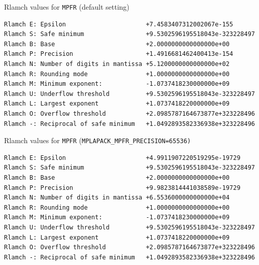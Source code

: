 \documentclass[12pt]{article}
\begin{document}
\begin{table}
\caption{Rlamch values for {\tt MPFR} (default setting) }\label{rlamchmpfr}
\begin{center}
\begin{verbatim}
Rlamch E: Epsilon                      +7.4583407312002067e-155
Rlamch S: Safe minimum                 +9.5302596195518043e-323228497
Rlamch B: Base                         +2.0000000000000000e+00
Rlamch P: Precision                    +1.4916681462400413e-154
Rlamch N: Number of digits in mantissa +5.1200000000000000e+02
Rlamch R: Rounding mode                +1.0000000000000000e+00
Rlamch M: Minimum exponent:            -1.0737418230000000e+09
Rlamch U: Underflow threshold          +9.5302596195518043e-323228497
Rlamch L: Largest exponent             +1.0737418220000000e+09
Rlamch O: Overflow threshold           +2.0985787164673877e+323228496
Rlamch -: Reciprocal of safe minimum   +1.0492893582336938e+323228496
\end{verbatim}
\end{center}
\end{table}

\begin{table}
\caption{Rlamch values for {\tt MPFR} ({\tt MPLAPACK\_MPFR\_PRECISION=65536)} }\label{rlamchmpfr_65536}
\begin{center}
\begin{verbatim}
Rlamch E: Epsilon                      +4.9911907220519295e-19729
Rlamch S: Safe minimum                 +9.5302596195518043e-323228497
Rlamch B: Base                         +2.0000000000000000e+00
Rlamch P: Precision                    +9.9823814441038589e-19729
Rlamch N: Number of digits in mantissa +6.5536000000000000e+04
Rlamch R: Rounding mode                +1.0000000000000000e+00
Rlamch M: Minimum exponent:            -1.0737418230000000e+09
Rlamch U: Underflow threshold          +9.5302596195518043e-323228497
Rlamch L: Largest exponent             +1.0737418220000000e+09
Rlamch O: Overflow threshold           +2.0985787164673877e+323228496
Rlamch -: Reciprocal of safe minimum   +1.0492893582336938e+323228496
\end{verbatim}
\end{center}
\end{table}
\end{document}
